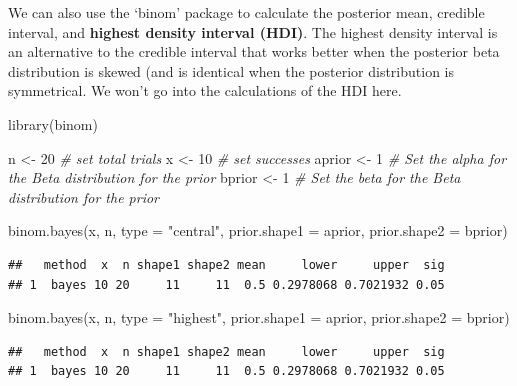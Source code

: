 \documentclass[
]{krantz}
\newenvironment{Shaded}{\begin{snugshade}}{\end{snugshade}}
\newcommand{\AttributeTok}[1]{\textcolor[rgb]{0.77,0.63,0.00}{#1}}
\newcommand{\CommentTok}[1]{\textcolor[rgb]{0.56,0.35,0.01}{\textit{#1}}}
\newcommand{\DecValTok}[1]{\textcolor[rgb]{0.00,0.00,0.81}{#1}}
\newcommand{\FunctionTok}[1]{\textcolor[rgb]{0.00,0.00,0.00}{#1}}
\newcommand{\NormalTok}[1]{#1}
\newcommand{\OtherTok}[1]{\textcolor[rgb]{0.56,0.35,0.01}{#1}}
\newcommand{\StringTok}[1]{\textcolor[rgb]{0.31,0.60,0.02}{#1}}
\begin{document}
We can also use the `binom' package to calculate the posterior mean, credible interval, and \textbf{highest density interval (HDI)}. The highest density interval is an alternative to the credible interval that works better when the posterior beta distribution is skewed (and is identical when the posterior distribution is symmetrical. We won't go into the calculations of the HDI here.

\begin{Shaded}
\begin{Highlighting}[]
\FunctionTok{library}\NormalTok{(binom)}

\NormalTok{n }\OtherTok{\textless{}{-}} \DecValTok{20} \CommentTok{\# set total trials}
\NormalTok{x }\OtherTok{\textless{}{-}} \DecValTok{10} \CommentTok{\# set successes}
\NormalTok{aprior }\OtherTok{\textless{}{-}} \DecValTok{1} \CommentTok{\# Set the alpha for the Beta distribution for the prior}
\NormalTok{bprior }\OtherTok{\textless{}{-}} \DecValTok{1} \CommentTok{\# Set the beta for the Beta distribution for the prior}

\FunctionTok{binom.bayes}\NormalTok{(x, n, }\AttributeTok{type =} \StringTok{"central"}\NormalTok{, }\AttributeTok{prior.shape1 =}\NormalTok{ aprior, }\AttributeTok{prior.shape2 =}\NormalTok{ bprior)}
\end{Highlighting}
\end{Shaded}

\begin{verbatim}
##   method  x  n shape1 shape2 mean     lower     upper  sig
## 1  bayes 10 20     11     11  0.5 0.2978068 0.7021932 0.05
\end{verbatim}

\begin{Shaded}
\begin{Highlighting}[]
\FunctionTok{binom.bayes}\NormalTok{(x, n, }\AttributeTok{type =} \StringTok{"highest"}\NormalTok{, }\AttributeTok{prior.shape1 =}\NormalTok{ aprior, }\AttributeTok{prior.shape2 =}\NormalTok{ bprior)}
\end{Highlighting}
\end{Shaded}

\begin{verbatim}
##   method  x  n shape1 shape2 mean     lower     upper  sig
## 1  bayes 10 20     11     11  0.5 0.2978068 0.7021932 0.05
\end{verbatim}
\end{document}

